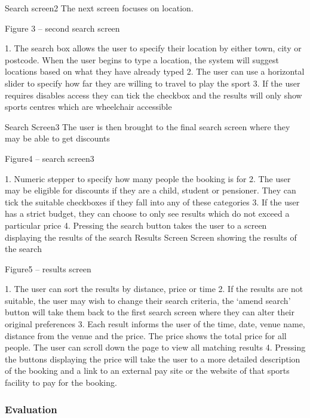 Search screen2
The next screen focuses on location.

Figure 3 – second search screen

1.       The search box allows the user to specify their location by either town, city or postcode. When the user begins to type a location, the system will suggest locations based on what they have already typed
2.       The user can use a horizontal slider to specify how far they are willing to travel to play the sport
3.       If the user requires disables access they can tick the checkbox and the results will only show sports centres which are wheelchair accessible

Search Screen3
The user is then brought to the final search screen where they may be able to get discounts

Figure4 – search screen3

1.       Numeric stepper to specify how many people the booking is for
2.       The user may be eligible for discounts if they are a child, student or pensioner. They can tick the suitable checkboxes if they fall into any of these categories
3.       If the user has a strict budget, they can choose to only see results which do not exceed a  particular price
4.       Pressing the search button takes the user to a screen displaying the results of the search
Results Screen
Screen showing the results of the search

Figure5 – results screen

1.       The user can sort the results by distance, price or time
2.       If the results are not suitable, the user may wish to change their search criteria, the `amend search' button will take them back to the first search screen where they can alter their original preferences
3.       Each result informs the user of the time, date, venue name, distance from the venue and the price. The price shows the total price for all people. The user can scroll down the page to view all matching results
4.       Pressing the buttons displaying the price will take the user to a more detailed description of the booking and a link to an external pay site or the website of that sports facility to pay for the booking.

\subsubsection{Evaluation}

